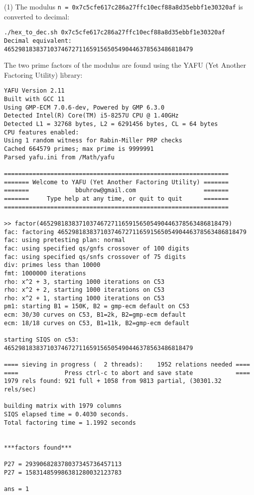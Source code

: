\documentclass[a4paper,11pt]{article}
\theoremstyle{mytheor}
\begin{document}
\noindent (1) The modulus \texttt{n = 0x7c5cfe617c286a27ffc10ecf88a8d35ebbf1e30320af} is converted to decimal:

\begin{verbatim}
./hex_to_dec.sh 0x7c5cfe617c286a27ffc10ecf88a8d35ebbf1e30320af
Decimal equivalent:
46529818383710374672711659156505490446378563486818479
\end{verbatim}


\noindent The two prime factors of the modulus are found using the YAFU (Yet Another Factoring Utility) library:
\begin{verbatim}
YAFU Version 2.11
Built with GCC 11
Using GMP-ECM 7.0.6-dev, Powered by GMP 6.3.0
Detected Intel(R) Core(TM) i5-8257U CPU @ 1.40GHz
Detected L1 = 32768 bytes, L2 = 6291456 bytes, CL = 64 bytes
CPU features enabled: 
Using 1 random witness for Rabin-Miller PRP checks
Cached 664579 primes; max prime is 9999991
Parsed yafu.ini from /Math/yafu

===============================================================
======= Welcome to YAFU (Yet Another Factoring Utility) =======
=======             bbuhrow@gmail.com                   =======
=======     Type help at any time, or quit to quit      =======
===============================================================

>> factor(46529818383710374672711659156505490446378563486818479)
fac: factoring 46529818383710374672711659156505490446378563486818479
fac: using pretesting plan: normal
fac: using specified qs/gnfs crossover of 100 digits
fac: using specified qs/snfs crossover of 75 digits
div: primes less than 10000
fmt: 1000000 iterations
rho: x^2 + 3, starting 1000 iterations on C53 
rho: x^2 + 2, starting 1000 iterations on C53 
rho: x^2 + 1, starting 1000 iterations on C53 
pm1: starting B1 = 150K, B2 = gmp-ecm default on C53
ecm: 30/30 curves on C53, B1=2k, B2=gmp-ecm default
ecm: 18/18 curves on C53, B1=11k, B2=gmp-ecm default

starting SIQS on c53: 46529818383710374672711659156505490446378563486818479

==== sieving in progress (  2 threads):    1952 relations needed ====
====             Press ctrl-c to abort and save state            ====
1979 rels found: 921 full + 1058 from 9813 partial, (30301.32 rels/sec)

building matrix with 1979 columns
SIQS elapsed time = 0.4030 seconds.
Total factoring time = 1.1992 seconds


***factors found***

P27 = 293906828378037345736457113
P27 = 158314859986381280032123783

ans = 1

\end{verbatim}
\end{document}
